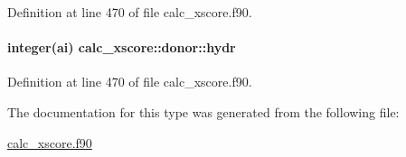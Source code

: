 Definition at line 470 of file calc\-\_\-xscore.\-f90.

\hypertarget{structcalc__xscore_1_1donor_aac5a6e49fa34e38cb05c783928bd1104}{
\paragraph[{hydr}]{\setlength{\rightskip}{0pt plus 5cm}integer(ai) calc\-\_\-xscore\-::donor\-::hydr}}\label{structcalc__xscore_1_1donor_aac5a6e49fa34e38cb05c783928bd1104}


Definition at line 470 of file calc\-\_\-xscore.\-f90.



The documentation for this type was generated from the following file\-:\begin{DoxyCompactItemize}
\item 
\hyperlink{calc__xscore_8f90}{calc\-\_\-xscore.\-f90}\end{DoxyCompactItemize}
